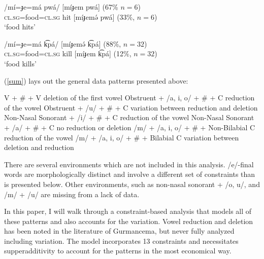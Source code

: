 \documentclass[output=paper,newtxmath,modfonts,nonflat,draftmode]{langsci/langscibook}
\begin{document}
\ea \label{m}
\ea
\gll /mí=ɟe=má pwá/ \hspace{0.5cm} [míɟem pwá] (67\% $n=6$)\\
 \textsc{cl.sg}=food=\textsc{cl.sg} hit  \hspace{0.5cm} [míɟemə́ pwá] (33\%, $n=6$)\\ 
\glt `food hits'

\ex
\gll /mí=ɟe=má k͡pá/ \hspace{.5cm} [míɟemə́ k͡pá] (88\%, $n=32$)\\
\textsc{cl.sg}=food=\textsc{cl.sg} kill \hspace{0.5cm} [míɟem k͡pá] (12\%, $n=32$)\\
\glt `food kills'
\z
\z

(\ref{sum}) lays out the general data patterns presented above:

\ea \label{sum}

V + \# + V \hfill deletion of the first vowel \newline
Obstruent + /a, i, o/ + \# + C \hfill reduction of the vowel\newline
Obstruent + /u/ + \# + C \hfill variation between reduction and deletion\newline
Non-Nasal Sonorant + /i/ + \# + C \hfill reduction of the vowel\newline
Non-Nasal Sonorant + /a/ + \# + C \hfill no reduction or deletion\newline
/m/ + /a, i, o/ + \# + Non-Bilabial C \hfill reduction of the vowel\newline
/m/ + /a, i, o/ + \# + Bilabial C \hfill variation between deletion and reduction\newline

\z

There are several environments which are not included in this analysis. /e/-final words are morphologically distinct and involve a different set of constraints than is presented below. Other environments, such as non-nasal sonorant + /o, u/, and /m/ + /u/ are missing from a lack of data. 

In this paper, I will walk through a constraint-based analysis that models all of these patterns and also accounts for the variation. Vowel reduction and deletion has been noted in the literature of Gurmancema, but never fully analyzed including variation. The model incorporates 13 constraints and necessitates supperadditivity \citep{AlbrightMagri2008,GreenDavis2014} to account for the patterns in the most economical way. 
\end{document}
